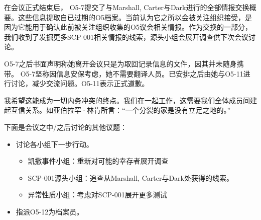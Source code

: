 
\begin{whiteboxbb}

在会议正式结束后， O5-7提交了与Marshall, 
Carter与Dark进行的全部情报交换概要。这些信息提取自已过期的O5档案。当前认为它之所以会被关注组织接受，是因为它能用于确认此前被关注组织收集的O5议会相关情报。作为交换的一部分，我们收到了发掘更多SCP-001相关情报的线索，源头小组会展开调查供下次会议讨论。

O5-7之后书面声明称她离开会议只是为取回记录信息的文件，因其并未随身携带。 
O5-7坚称因信息安保考虑，她不需要翻译人员。已安排之后由她与O5-11进行讨论，减少交流问题。O5-11表示正式道歉。

我希望这能成为一切内务冲突的终点。我们在一起工作，这需要我们全体成员间建起互信关系。如亚伯拉罕·林肯所言：“一个分裂的家是没有立足之地的。”


\end{whiteboxbb}

下面是会议之中\slash 之后讨论的其他议题：

\begin{itemize}
\item 讨论各小组下一步行动。
\begin{itemize}
\item 凯撒事件小组：重新对可能的幸存者展开调查
\item SCP-001源头小组：追查从Marshall, Carter与Dark处获得的线索。
\item 异常性质小组：考虑对SCP-001展开更多测试
\end{itemize}
\item 指派O5-12为档案员。
\end{itemize}





